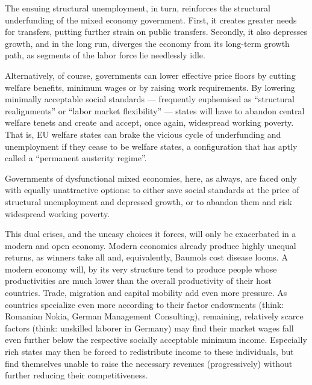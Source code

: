 The ensuing structural unemployment, in turn, reinforces the structural underfunding of the mixed economy government. First, it creates greater needs for transfers, putting further strain on public transfers. Secondly, it also depresses growth, and in the long run, diverges the economy from its long-term growth path, as segments of the labor force lie needlessly idle.


Alternatively, of course, governments can lower effective price floors by cutting welfare benefits, minimum wages or by raising work requirements. By lowering minimally acceptable social standards --- frequently euphemised as ``structural realignments'' or ``labor market flexibility'' --- states will have to abandon central welfare tenets and create and accept, once again, widespread working poverty. %
That is, \gls{EU} welfare states can brake the vicious cycle of underfunding and unemployment if they cease to be welfare states, a configuration that \cite{Streeck2010c} has aptly called a ``permanent austerity regime''. %

Governments of dysfunctional mixed economies, here, as always, are faced only with equally unattractive options: to either save social standards at the price of structural unemployment and depressed growth, or to abandon them and risk widespread working poverty.

This dual crises, and the uneasy choices it forces, will only be exacerbated in a modern and open economy. Modern economies already produce highly unequal returns, as winners take all and, equivalently, Baumols cost disease looms. A modern economy will, by its very structure tend to produce people whose productivities are much lower than the overall productivity of their host countries. %
Trade, migration and capital mobility add even more pressure. As countries specialize even more according to their factor endowments (think: Romanian Nokia, German Management Consulting), remaining, relatively scarce factors (think: unskilled laborer in Germany) may find their market wages fall even further below the respective socially acceptable minimum income. Especially rich states may then be forced to redistribute income to these individuals, but find themselves unable to raise the necessary revenues (progressively) without further reducing their competitiveness. 


